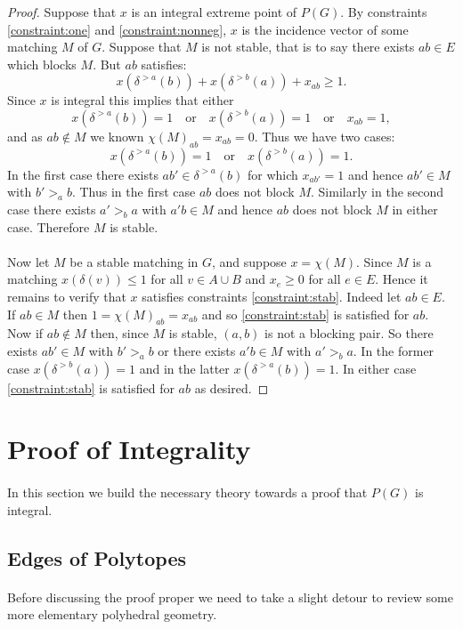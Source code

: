 \begin{proof}
Suppose that $x$ is an integral extreme point of $P(G)$. By constraints \ref{constraint:one} and \ref{constraint:nonneg}, $x$ is the incidence vector of some matching $M$ of $G$. Suppose that $M$ is not stable, that is to say there exists $ab \in E$ which blocks $M$. But $ab$ satisfies:
$$x(\delta^{>a}(b)) + x(\delta^{>b}(a)) + x_{ab} \geq 1.$$
Since $x$ is integral this implies that either
$$x(\delta^{>a}(b)) = 1 \quad\text{or}\quad  x(\delta^{>b}(a)) = 1 \quad\text{or}\quad x_{ab}=1,$$
and as $ab \not\in M$ we known $\chi(M)_{ab} = x_{ab}=0$. Thus we have two cases:
$$x(\delta^{>a}(b)) = 1 \quad\text{or}\quad  x(\delta^{>b}(a)) = 1.$$
In the first case there exists $ab' \in \delta^{>a}(b)$ for which $x_{ab'} = 1$ and hence $ab' \in M$  with $b' >_a b$. Thus in the first case $ab$ does not block $M$. Similarly in the second case there exists $a' >_b a$ with $a'b \in M$ and hence $ab$ does not block $M$ in either case. Therefore $M$ is stable.
\paragraph{}
Now let $M$ be a stable matching in $G$, and suppose  $x = \chi(M)$. Since $M$ is a matching $x(\delta(v)) \leq 1$ for all $v \in A \cup B$ and $x_e \geq 0$ for all $e \in E$. Hence it remains to verify that $x$ satisfies constraints \ref{constraint:stab}. Indeed let $ab \in E$. If $ab \in M$ then $1 = \chi(M)_{ab} = x_{ab}$ and so \ref{constraint:stab} is satisfied for $ab$. Now if $ab \not\in M$ then, since $M$ is stable, $(a,b)$ is not a blocking pair. So there exists $ab' \in M$ with $b' >_a b$ or there exists $a'b \in M$ with $a' >_b a$. In the former case $x(\delta^{>b}(a)) = 1$ and in the latter $x(\delta^{>a}(b)) = 1$. In either case \ref{constraint:stab} is satisfied for $ab$ as desired.  
\end{proof}
\section{Proof of Integrality}
\paragraph{}
In this section we build the necessary theory towards a proof that $P(G)$ is integral.
\subsection{Edges of Polytopes}
\paragraph{}
Before discussing the proof proper we need to take a slight detour to review some more elementary polyhedral geometry.

